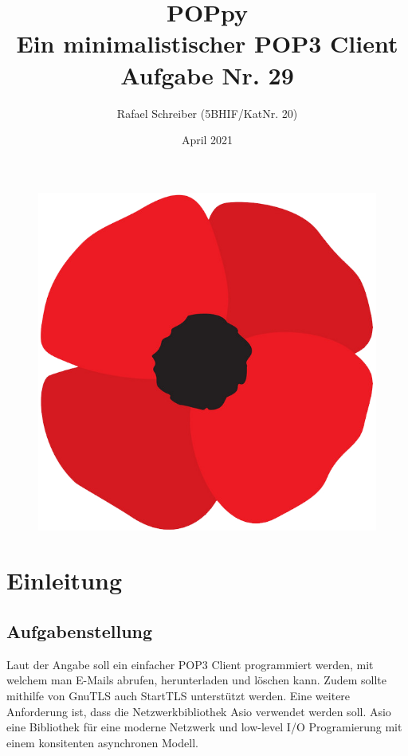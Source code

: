 \documentclass[12pt]{article}
\begin{document}
\clearpage
\thispagestyle{empty}
\author{Rafael Schreiber (5BHIF/KatNr. 20)}
\date{April 2021}
\title{POPpy \\ Ein minimalistischer POP3 Client \\ Aufgabe Nr. 29}
\maketitle
\begin{figure}[htbp]
    \centering
    \includegraphics[scale=0.2]{poppy_logo}
    \label{fig:situation1}
\end{figure}
\FloatBarrier
\clearpage
{}
\tableofcontents
\newpage

\section{Einleitung}
\subsection{Aufgabenstellung}
Laut der Angabe soll ein einfacher POP3 Client programmiert werden, mit welchem
man E-Mails abrufen, herunterladen und löschen kann. Zudem sollte mithilfe von
GnuTLS \cite{gnutls} auch StartTLS unterstützt werden.
\newline
Eine weitere Anforderung ist, dass die Netzwerkbibliothek Asio \cite{asio} 
verwendet werden soll. Asio eine Bibliothek für eine moderne Netzwerk und 
low-level I/O Programierung mit einem konsitenten asynchronen Modell.
\end{document}
